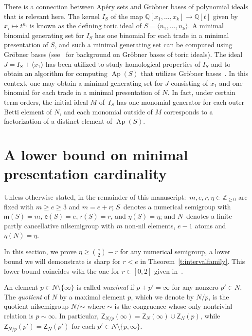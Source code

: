 \documentclass[ALCO]{cedram}
\newcommand\ZZ{\mathbb{Z}}
\newcommand\QQ{\mathbb{Q}}
\newcommand\til{\mathord\sim}
\DeclareMathOperator\Ap{Ap}
\begin{document}
\begin{rema}\label{r:groenberbases}
There is a connection between Ap\'ery sets and Gr\"obner bases of polynomial ideals that is relevant here.  
The kernel $I_S$ of the map $\QQ[x_1, \ldots, x_k] \to \QQ[t]$ given by $x_i \mapsto t^{n_i}$ is known as the defining toric ideal of $S = \langle n_1, \ldots, n_k \rangle$.  A minimal binomial generating set for $I_S$ has one binomial for each trade in a minimal presentation of $S$, and such a minimal generating set can be computed using Gr\"obner bases (see~\cite{grobpoly} for background on Gr\"obner bases of toric ideals).  
The ideal $J = I_S + \langle x_1 \rangle$ has been utilized to study homological properties of $I_S$ and to obtain an algorithm for computing $\Ap(S)$ that utilizes Gr\"obner bases~\cite{compapery,shortresolutionalg}.  In this context, one may obtain a minimal generating set for $J$ consisting of $x_1$ and one binomial for each trade in a minimal presentation of $N$.  In fact, under certain term orders, the initial ideal $M$ of~$I_S$ has one monomial generator for each outer Betti element of $N$, and each monomial outside of $M$ corresponds to a factorization of a distinct element of $\Ap(S)$.  
\end{rema}





\section{A lower bound on minimal presentation cardinality}
\label{sec:lowerbound}


\begin{nota}
Unless otherwise stated, in the remainder of this manuscript:\ $m, e, r, \eta \in \ZZ_{\ge 0}$ are fixed with $m \ge e \ge 3$ and $m = e + r$; $S$~denotes a numerical semigroup with $\mathsf m(S) = m$, $\mathsf e(S) = e$, $\mathsf r(S) = r$, and $\eta(S) = \eta$; and $N$~denotes a finite partly cancellative nilsemigroup with $m$ non-nil elements, $e-1$ atoms and $\eta(N) = \eta$.  
\end{nota}

In this section, we prove $\eta \ge \binom{e}{2} - r$ for any numerical semigroup, a lower bound we will demonstrate is sharp for $r < e$ in Theorem~\ref{t:intervalfamily}.  This lower bound coincides with the one for $r \in [0,2]$ given in~\cite{highembdim}.

\begin{defi}\label{d:maximalelement}
An element $p\in N\setminus\{\infty\}$ is called \emph{maximal} if $p+p' = \infty$ for any nonzero $p' \in N$. The \emph{quotient} of $N$ by a maximal element $p$, which we denote by $N/p$, is the quotient nilsemigroup $N/\til$ where $\til$ is the congruence whose only nontrivial relation is $p \sim\infty$.  
In particular, $\mathsf Z_{N/p}(\infty) = \mathsf Z_N(\infty) \cup \mathsf Z_N(p)$, while $\mathsf Z_{N/p}(p') = \mathsf Z_N(p')$ for each $p' \in N \setminus \{p, \infty\}$.  
\end{defi}
\end{document}

